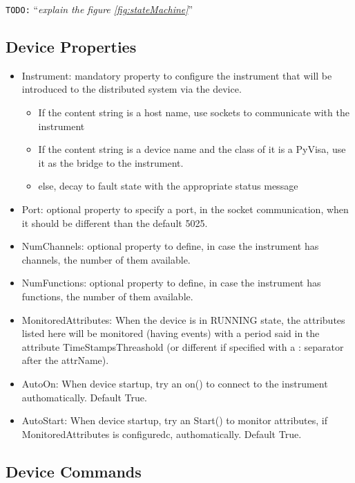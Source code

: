 \documentclass[a4paper,10pt]{article}
\newcommand{\todo}[1]{\texttt{\color{red}TODO:} ``\emph{#1}''}
\begin{document}
\todo{explain the figure \ref{fig:stateMachine}}

\subsection{Device Properties}

\begin{itemize}
    \item Instrument: mandatory property to configure the instrument that will be introduced to the distributed system via the device.
    \begin{itemize}
        \item If the content string is a host name, use sockets to communicate with the instrument
        \item If the content string is a device name and the class of it is a PyVisa, use it as the bridge to the instrument.
        \item else, decay to fault state with the appropriate status message
    \end{itemize}
    \item Port: optional property to specify a port, in the socket communication, when it should be different than the default 5025.
    \item NumChannels: optional property to define, in case the instrument has channels, the number of them available.
    \item NumFunctions: optional property to define, in case the instrument has functions, the number of them available.
    \item MonitoredAttributes: When the device is in RUNNING state, the attributes listed here will be monitored (having events) with a period said in the attribute TimeStampsThreashold (or different if specified with a : separator after the attrName).
    \item AutoOn: When device startup, try an on() to connect to the instrument authomatically. Default True.
    \item AutoStart: When device startup, try an Start() to monitor attributes, if MonitoredAttributes is configuredc, authomatically. Default True.
\end{itemize}

\subsection{Device Commands}
\end{document}
